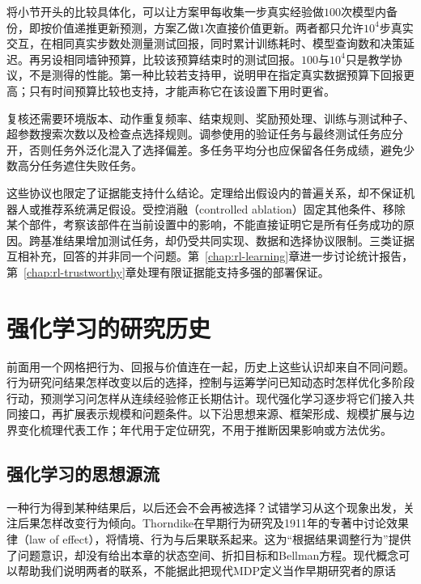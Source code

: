 将小节开头的比较具体化，可以让方案甲每收集一步真实经验做$100$次模型内备份，即按价值递推更新预测，方案乙做$1$次直接价值更新。两者都只允许$10^4$步真实交互，在相同真实步数处测量测试回报，同时累计训练耗时、模型查询数和决策延迟。再另设相同墙钟预算，比较该预算结束时的测试回报。$100$与$10^4$只是教学协议，不是测得的性能。第一种比较若支持甲，说明甲在指定真实数据预算下回报更高；只有时间预算比较也支持，才能声称它在该设置下用时更省。

复核还需要环境版本、动作重复频率、结束规则、奖励预处理、训练与测试种子、超参数搜索次数以及检查点选择规则。调参使用的验证任务与最终测试任务应分开，否则任务外泛化混入了选择偏差。多任务平均分也应保留各任务成绩，避免少数高分任务遮住失败任务。

这些协议也限定了证据能支持什么结论。定理给出假设内的普遍关系，却不保证机器人或推荐系统满足假设。受控消融（controlled ablation）固定其他条件、移除某个部件，考察该部件在当前设置中的影响，不能直接证明它是所有任务成功的原因。跨基准结果增加测试任务，却仍受共同实现、数据和选择协议限制。三类证据互相补充，回答的并非同一个问题。第~\ref{chap:rl-learning}章进一步讨论统计报告，第~\ref{chap:rl-trustworthy}章处理有限证据能支持多强的部署保证。

\section{强化学习的研究历史}
\label{sec:rl-overview-history}

前面用一个网格把行为、回报与价值连在一起，历史上这些认识却来自不同问题。行为研究问结果怎样改变以后的选择，控制与运筹学问已知动态时怎样优化多阶段行动，预测学习问怎样从连续经验修正长期估计。现代强化学习逐步将它们接入共同接口，再扩展表示规模和问题条件。以下沿思想来源、框架形成、规模扩展与边界变化梳理代表工作；年代用于定位研究，不用于推断因果影响或方法优劣。

\subsection{强化学习的思想源流}
\label{sec:rl-overview-origins}

一种行为得到某种结果后，以后还会不会再被选择？试错学习从这个现象出发，关注后果怎样改变行为倾向。Thorndike在早期行为研究及1911年的专著中讨论效果律（law of effect），将情境、行为与后果联系起来。这为“根据结果调整行为”提供了问题意识，却没有给出本章的状态空间、折扣目标和Bellman方程。现代概念可以帮助我们说明两者的联系，不能据此把现代MDP定义当作早期研究者的原话

